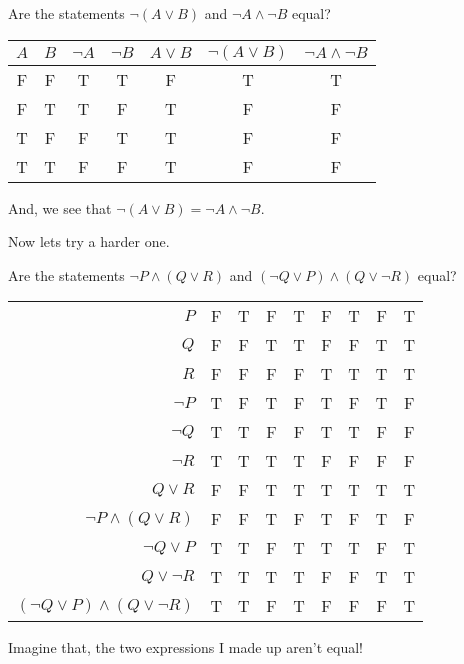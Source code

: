 \begin{boxexample}{}{}
	Are the statements $\neg (A \lor B)$ and $\neg A \land \neg B$ equal?

	\medskip
	\begin{tabular}{g|g|c|c|c|g|g}
		\hline
		$A$ & $B$ & $\neg A$ & $\neg B$ & $A \lor B$ & $\neg (A \lor B)$ & $\neg A \land \neg B$\\
		\hline
		F & F & T & T & F & T & T\\
		F & T & T & F & T & F & F\\
		T & F & F & T & T & F & F\\
		T & T & F & F & T & F & F\\
		\hline
	\end{tabular}
	\medskip

	And, we see that $\neg (A \lor B) = \neg A \land \neg B$.
\end{boxexample}

Now lets try a harder one.

\begin{boxexample}{}{}
	Are the statements $\neg P \land (Q \lor R)$ and $(\neg Q \lor P) \land (Q \lor \neg R)$ equal?

	\medskip
	\begin{tabular}{r|c c c c c c c c}
		\hline
		\rowcolor{skyblue}
		$P$ & F & T & F & T & F & T & F & T\\
		\rowcolor{skyblue}
		$Q$ & F & F & T & T & F & F & T & T\\
		\rowcolor{skyblue}
		$R$ & F & F & F & F & T & T & T & T\\
		$\neg P$ & T & F & T & F & T & F & T & F\\
		$\neg Q$ & T & T & F & F & T & T & F & F\\
		$\neg R$ & T & T & T & T & F & F & F & F\\
		$Q \lor R$ & F & F & T & T & T & T & T & T\\
		\rowcolor{skyblue}
		$\neg P \land (Q \lor R)$ & F & F & T & F & T & F & T & F\\
		$\neg Q \lor P$ & T & T & F & T & T & T & F & T\\
		$Q \lor \neg R$ & T & T & T & T & F & F & T & T\\
		\rowcolor{skyblue}
		$(\neg Q \lor P) \land (Q \lor \neg R)$ & T & T & F & T & F & F & F & T\\
		\hline
	\end{tabular}
	\medskip

	Imagine that, the two expressions I made up aren't equal!
\end{boxexample}

